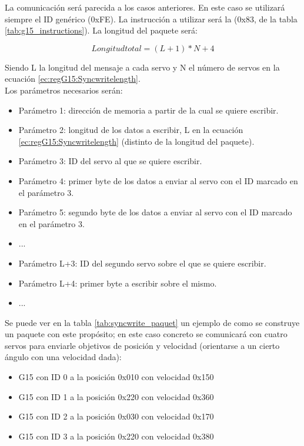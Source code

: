 		La comunicación será parecida a los casos anteriores. En este caso se utilizará siempre el ID genérico (0xFE). La instrucción a utilizar será la  (0x83, de la tabla \ref{tab:g15_instructions}). La longitud del paquete será:

		\begin{equation}
		\label{ec:regG15:Syncwritelength}
			Longitud total = (L+1) * N + 4
		\end{equation}

		Siendo L la longitud del mensaje a cada servo y N el número de servos en la ecuación \ref{ec:regG15:Syncwritelength}.
		\\

		Los parámetros necesarios serán:
		\\

		\begin{itemize}
			\item Parámetro 1: dirección de memoria a partir de la cual se quiere escribir.
			\item Parámetro 2: longitud de los datos a escribir, L en la ecuación \ref{ec:regG15:Syncwritelength} (distinto de la longitud del paquete).
			\item Parámetro 3: ID del servo al que se quiere escribir.
			\item Parámetro 4: primer byte de los datos a enviar al servo con el ID marcado en el parámetro 3.
			\item Parámetro 5: segundo byte de los datos a enviar al servo con el ID marcado en el parámetro 3.
			\item ...
			\item Parámetro L+3: ID del segundo servo sobre el que se quiere escribir.
			\item Parámetro L+4: primer byte a escribir sobre el mismo.
			\item ...
		\end{itemize}

		Se puede ver en la tabla \ref{tab:syncwrite_paquet} un ejemplo de como se construye un paquete con este propósito; en este caso concreto se comunicará con cuatro servos para enviarle objetivos de posición y velocidad (orientarse a un cierto ángulo con una velocidad dada):
		\\

		\begin{itemize}
			\item G15 con ID 0 a la posición 0x010 con velocidad 0x150
			\item G15 con ID 1 a la posición 0x220 con velocidad 0x360
			\item G15 con ID 2 a la posición 0x030 con velocidad 0x170
			\item G15 con ID 3 a la posición 0x220 con velocidad 0x380
		\end{itemize}

